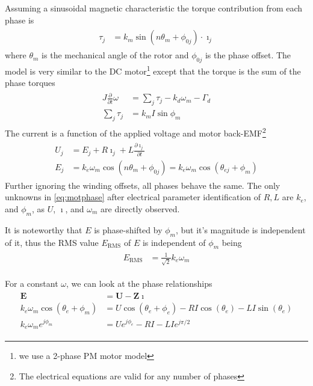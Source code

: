 \documentclass[12pt,a4paper,oneside,openany]{article}
\begin{document}
Assuming a sinusoidal magnetic characteristic the torque contribution from each phase is
\begin{gather}
\begin{aligned}
\tau_j &= k_m \sin \left( n \theta_m + \phi_{0j}\right) \cdot \imath_j
\end{aligned}
\end{gather}
where $\theta_m$ is the mechanical angle of the rotor and $\phi_{0j}$ is the phase offset. The model is very similar to the DC motor\footnote{we use a 2-phase PM motor model} except that the torque is the sum of the phase torques
\begin{gather}
\begin{aligned}
J \frac{\partial }{\partial t} \omega &= \sum_j\tau_j - k_d \omega_m - \Gamma_d \\
\sum_j \tau_j &= k_m I \sin \phi_m
\end{aligned}
\end{gather}
The current is a function of the applied voltage and motor back-EMF\footnote{The electrical equations are valid for any number of phases}
\begin{gather}
\begin{aligned}
\label{eq:motphase} U_j &= E_j + R \imath_j + L \frac{\partial \imath_j}{\partial t} \\
E_j &= k_e \omega_m \cos \left( n \theta_m + \phi_{0j} \right) = k_e \omega_m \cos \left( \theta_{ej} + \phi_m \right)
\end{aligned}
\end{gather}
Further ignoring the winding offsets, all phases behave the same. The only unknowns in \cref{eq:motphase} after electrical parameter identification of $R,L$ are $k_e$, and $\phi_m$, as $U$, $\imath$, and $\omega_m$ are directly observed.

It is noteworthy that $E$ is phase-shifted by $\phi_m$, but it's magnitude is independent of it, thus the RMS value $E_{\mathrm{RMS}}$ of $E$ is independent of $\phi_m$ being
\begin{gather}
\begin{aligned}
E_{\mathrm{RMS}} &= \frac{1}{\sqrt{2}} k_e \omega_m
\end{aligned}
\end{gather}

For a constant $\omega$, we can look at the phase relationships
\begin{gather}
\begin{aligned}
\mathbf{E} &= \mathbf{U} - \mathbf{Z} \mathbf{\imath} \\
k_e \omega_m \cos \left( \theta_{e} + \phi_m \right) &= U \cos(\theta_{e} + \phi_e) - R I \cos(\theta_e) - LI \sin(\theta_e) \\
k_e \omega_m e^{j \phi_m}  &= U e^{j \phi_e} - R I - LI e^{j \pi/2}
\end{aligned}
\end{gather}
\end{document}
